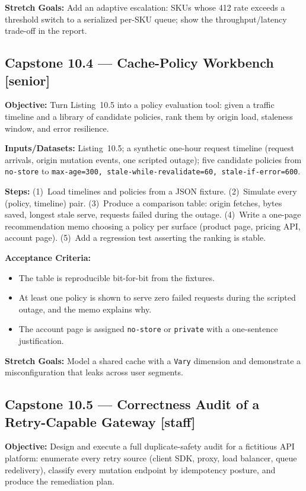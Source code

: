 \textbf{Stretch Goals:} Add an adaptive escalation: SKUs whose 412 rate
exceeds a threshold switch to a serialized per-SKU queue; show the
throughput/latency trade-off in the report.

\subsection*{Capstone 10.4 --- Cache-Policy Workbench \hfill [senior]}
\textbf{Objective:} Turn Listing~10.5 into a policy evaluation tool: given a
traffic timeline and a library of candidate policies, rank them by origin
load, staleness window, and error resilience.

\textbf{Inputs/Datasets:} Listing~10.5; a synthetic one-hour request
timeline (request arrivals, origin mutation events, one scripted outage);
five candidate policies from \texttt{no-store} to
\texttt{max-age=300, stale-while-revalidate=60, stale-if-error=600}.

\textbf{Steps:} (1)~Load timelines and policies from a JSON fixture.
(2)~Simulate every (policy, timeline) pair. (3)~Produce a comparison table:
origin fetches, bytes saved, longest stale serve, requests failed during the
outage. (4)~Write a one-page recommendation memo choosing a policy per
surface (product page, pricing API, account page). (5)~Add a regression
test asserting the ranking is stable.

\textbf{Acceptance Criteria:}
\begin{itemize}
  \item[$\square$] The table is reproducible bit-for-bit from the fixtures.
  \item[$\square$] At least one policy is shown to serve zero failed
        requests during the scripted outage, and the memo explains why.
  \item[$\square$] The account page is assigned \texttt{no-store} or
        \texttt{private} with a one-sentence justification.
\end{itemize}

\textbf{Stretch Goals:} Model a shared cache with a \texttt{Vary} dimension
and demonstrate a misconfiguration that leaks across user segments.

\subsection*{Capstone 10.5 --- Correctness Audit of a Retry-Capable Gateway \hfill [staff]}
\textbf{Objective:} Design and execute a full duplicate-safety audit for a
fictitious API platform: enumerate every retry source (client SDK, proxy,
load balancer, queue redelivery), classify every mutation endpoint by
idempotency posture, and produce the remediation plan.

